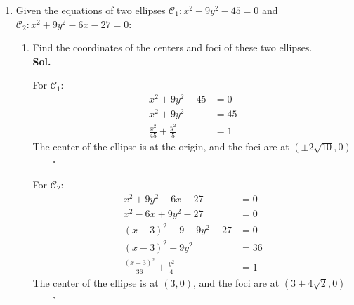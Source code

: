 \documentclass{report}
\newcommand{\sol}{\vspace{1em}\\\textbf{Sol.}}
\newcommand{\eos}{ \qquad \square}
\begin{document}
\begin{enumerate}
    \item Given the equations of two ellipses $\mathcal{C}_1: x^2 + 9y^2 - 45 = 0$ and
          $\mathcal{C}_2: x^2 + 9y^2 - 6x - 27 = 0$:
          \begin{enumerate}
              \item Find the coordinates of the centers and foci of these two ellipses. \sol{}

                    For $\mathcal{C}_1$:
                    \begin{align*}
                        x^2 + 9y^2 - 45                & = 0  \\
                        x^2 + 9y^2                     & = 45 \\
                        \frac{x^2}{45} + \frac{y^2}{5} & = 1
                    \end{align*}
                    The center of the ellipse is at the origin, and the foci are at $(\pm 2\sqrt{10}, 0)$ $\eos$

                    For $\mathcal{C}_2$:
                    \begin{align*}
                        x^2 + 9y^2 - 6x - 27                 & = 0  \\
                        x^2 - 6x + 9y^2 - 27                 & = 0  \\
                        (x - 3)^2 - 9 + 9y^2 - 27            & = 0  \\
                        (x - 3)^2 + 9y^2                     & = 36 \\
                        \frac{(x - 3)^2}{36} + \frac{y^2}{4} & = 1
                    \end{align*}
                    The center of the ellipse is at $(3, 0)$, and the foci are at $(3 \pm 4\sqrt{2}, 0)$ $\eos$


\end{enumerate}
\end{enumerate}
\end{document}
